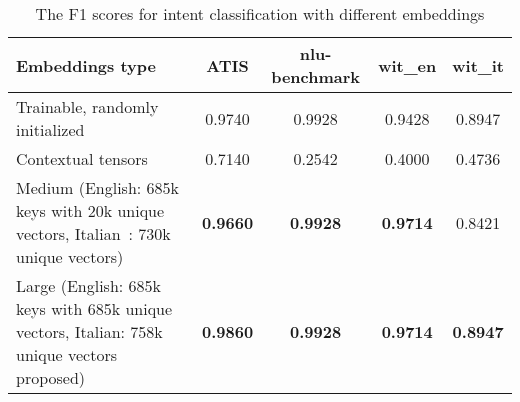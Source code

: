 
\begin{table}
	\begin{tabularx}{\textwidth}{Lcccc}
		\toprule
		\textbf{Embeddings type} & \textbf{ATIS} & \textbf{nlu-benchmark} & \textbf{wit\_en} & \textbf{wit\_it} \\
		\midrule
		Trainable, randomly initialized & 0.9740 & 0.9928 & 0.9428 & 0.8947 \\
		\midrule
		Contextual tensors & 0.7140 & 0.2542 & 0.4000 & 0.4736 \\
		\midrule
		Medium (English: 685k keys with 20k unique vectors, Italian~\cite{berardi2015word}: 730k unique vectors) & \textbf{0.9660} & \textbf{0.9928} &\textbf{0.9714} & 0.8421 \\
		\midrule
		Large (English: 685k keys with 685k unique vectors, Italian: 758k unique vectors proposed) & \textbf{0.9860} & \textbf{0.9928} & \textbf{0.9714} & \textbf{0.8947} \\
		\bottomrule
	\end{tabularx}
	\caption{The F1 scores for intent classification with different embeddings}\label{tab:intentsEmbeddingsChoice}
\end{table}